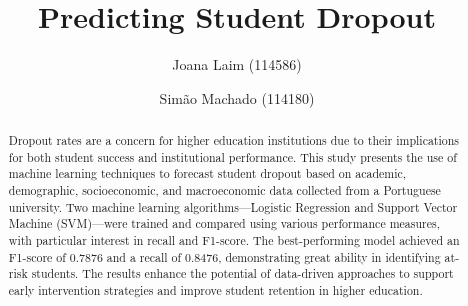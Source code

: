 \documentclass[runningheads]{llncs}
\begin{document}
%
\title{Predicting Student Dropout}
%
%
\author{Joana Laim (114586) \and
Simão Machado (114180)}


%
\maketitle              %
%
\begin{abstract} Dropout rates are a concern for higher education institutions due to their implications for both student success and institutional performance. This study presents the use of machine learning techniques to forecast student dropout based on academic, demographic, socioeconomic, and macroeconomic data collected from a Portuguese university. Two machine learning algorithms—Logistic Regression and Support Vector Machine (SVM)—were trained and compared using various performance measures, with particular interest in recall and F1-score. The best-performing model achieved an F1-score of 0.7876 and a recall of 0.8476, demonstrating great ability in identifying at-risk students. The results enhance the potential of data-driven approaches to support early intervention strategies and improve student retention in higher education.

\end{abstract}
%
%
%
\end{document}
